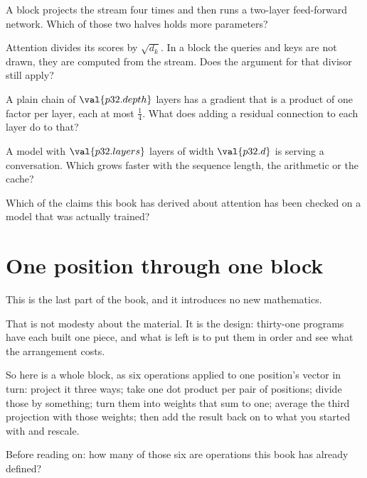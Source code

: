 \begin{quiz}
\item A block projects the stream four times and then runs a two-layer
  feed-forward network. Which of those two halves holds more parameters?
\item Attention divides its scores by $\sqrt{d_k}$. In a block the queries
  and keys are not drawn, they are computed from the stream. Does the
  argument for that divisor still apply? 
\item A plain chain of $\val{p32.depth}$ layers has a gradient that is a
  product of one factor per layer, each at most $\frac{1}{4}$. What does
  adding a residual connection to each layer do to that? 
\item A model with $\val{p32.layers}$ layers of width $\val{p32.d}$ is
  serving a conversation. Which grows faster with the sequence length, the
  arithmetic or the cache? 
\item Which of the claims this book has derived about attention has been
  checked on a model that was actually trained? 
\end{quiz}

\section{One position through one block}
\label{sec:P32-one-block}

\begin{fr}
This is the last part of the book, and it introduces no new mathematics.

That is not modesty about the material. It is the design: thirty-one
programs have each built one piece, and what is left is to put them in
order and see what the arrangement costs.

So here is a whole block, as six operations applied to one position's vector
in turn: project it three ways; take one dot product per pair of positions;
divide those by something; turn them into weights that sum to one; average
the third projection with those weights; then add the result back on to what
you started with and rescale.

Before reading on: how many of those six are operations this book has
already defined?
\dotline
\nextframe
\end{fr}

